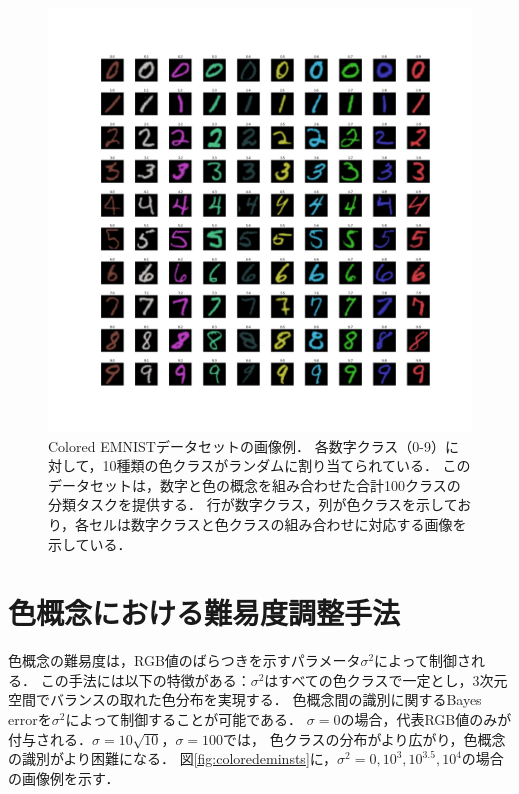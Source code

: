 \begin{figure}[H]
    \centering
    \includegraphics[width=1\columnwidth]{fig/coloredemnist_0.pdf}
    \caption[Colored EMNISTデータセットの画像例．]{
        Colored EMNISTデータセットの画像例．
        各数字クラス（0-9）に対して，10種類の色クラスがランダムに割り当てられている．
        このデータセットは，数字と色の概念を組み合わせた合計100クラスの分類タスクを提供する．
        行が数字クラス，列が色クラスを示しており，各セルは数字クラスと色クラスの組み合わせに対応する画像を示している．
    }
    \label{fig:ColoredEMNIST}
\end{figure}

\newpage

\section{色概念における難易度調整手法}
色概念の難易度は，RGB値のばらつきを示すパラメータ$\sigma^2$によって制御される．
この手法には以下の特徴がある：$\sigma^2$はすべての色クラスで一定とし，3次元空間でバランスの取れた色分布を実現する．
色概念間の識別に関するBayes errorを$\sigma^2$によって制御することが可能である．
$\sigma = 0$の場合，代表RGB値のみが付与される．$\sigma = 10\sqrt{10}$，$\sigma = 100$では，
色クラスの分布がより広がり，色概念の識別がより困難になる．
図\ref{fig:coloredeminsts}に，$\sigma^2 = 0, 10^3, 10^{3.5}, 10^4$の場合の画像例を示す．

